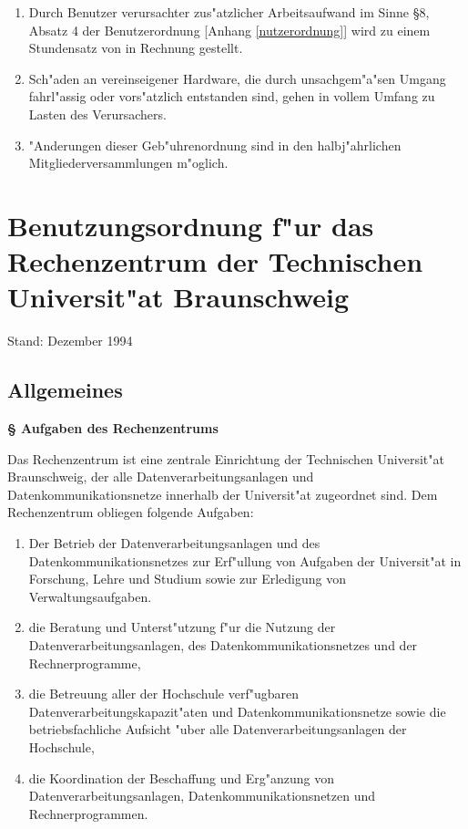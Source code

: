 \documentclass[12pt,titlepage,twoside]{scrartcl}
\newcounter{para_nr}
\newcommand{\Paragraph}[1]{{\large\bf\S{}\sf\textbf{\/\stepcounter{para_nr}\arabic{para_nr} #1}}}
\begin{document}
\begin{appendix}
\begin{enumerate}
\item Durch Benutzer verursachter zus"atzlicher Arbeitsaufwand im Sinne \S{}8,
  Absatz 4 der Benutzerordnung [Anhang \ref{nutzerordnung}] wird zu
  einem Stundensatz von  in Rechnung gestellt.

\item Sch"aden an vereinseigener Hardware, die durch unsachgem"a"sen Umgang
  fahrl"assig oder vors"atzlich entstanden sind, gehen in vollem Umfang zu
  Lasten des Verursachers.

\item "Anderungen dieser Geb"uhrenordnung sind in den halbj"ahrlichen
  Mitgliederversammlungen m"oglich.
\end{enumerate}

\clearpage

\setcounter{para_nr}{0}
\renewcommand{\thesubsection}{\Roman{subsection}}

\section[RZ-Benutzungsordnung der TU Braunschweig]{Benutzungsordnung f"ur das
  Rechenzentrum der Technischen Universit"at Braunschweig}
\label{RZordnung}

{\small Stand: Dezember 1994}

\subsection{Allgemeines}

\Paragraph{Aufgaben des Rechenzentrums}

Das Rechenzentrum ist eine zentrale Einrichtung der Technischen
Universit"at Braunschweig, der alle Datenverarbeitungsanlagen und
Datenkommunikationsnetze innerhalb der Universit"at zugeordnet sind.
Dem Rechenzentrum obliegen folgende Aufgaben:

\begin{enumerate}
 \item Der Betrieb der Datenverarbeitungsanlagen und des
       Datenkommunikationsnetzes zur Erf"ullung von Aufgaben der
       Universit"at in Forschung, Lehre und Studium sowie zur
       Erledigung von Verwaltungsaufgaben.
 \item die Beratung und Unterst"utzung f"ur die Nutzung der
       Datenverarbeitungsanlagen, des Datenkommunikationsnetzes und der
       Rechnerprogramme,
 \item die Betreuung aller der Hochschule verf"ugbaren
       Datenverarbeitungskapazit"aten und Datenkommunikationsnetze
       sowie die betriebsfachliche Aufsicht "uber alle
       Datenverarbeitungsanlagen der Hochschule,
 \item die Koordination der Beschaffung und Erg"anzung von
       Datenverarbeitungsanlagen, Datenkommunikationsnetzen und
       Rechnerprogrammen.
\end{enumerate}


\end{appendix}
\end{document}
